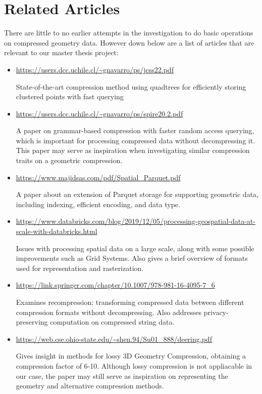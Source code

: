 \documentclass{article}
\begin{document}

\section{Related Articles}


There are little to no earlier attempts in the investigation to do basic operations on compressed geometry data. However down below are a list of articles that are relevant to our master thesis project:
\begin{itemize}
\item \url{https://users.dcc.uchile.cl/~gnavarro/ps/jcss22.pdf}

State-of-the-art compression method using quadtrees for efficiently storing clustered points with fast querying

\item \url{https://users.dcc.uchile.cl/~gnavarro/ps/spire20.2.pdf}

A paper on grammar-based compression with faster random access querying, which is important for processing compressed data without decompressing it. This paper may serve as inspiration when investigating similar compression traits on a geometric compression. 

\item \url{https://www.majidsas.com/pdf/Spatial_Parquet.pdf}

A paper about an extension of Parquet storage for supporting geometric data, including indexing, efficient encoding, and data type.

\item \url{https://www.databricks.com/blog/2019/12/05/processing-geospatial-data-at-scale-with-databricks.html}

Issues with processing spatial data on a large scale, along with some possible improvements such as Grid Systems. Also gives a brief overview of formats used for representation and rasterization. 

\item \url{https://link.springer.com/chapter/10.1007/978-981-16-4095-7_6}

Examines recompression; transforming compressed data between different compression formats without decompressing. Also addresses privacy-preserving computation on compressed string data.  

\item \url{https://web.cse.ohio-state.edu/~shen.94/Su01_888/deering.pdf}

Gives insight in methods for lossy 3D Geometry Compression, obtaining a compression factor of 6-10. Although lossy compression is not appliacable in our case, the paper may still serve as inspiration on representing the geometry and alternative compression methods.




\end{itemize}
\end{document}
